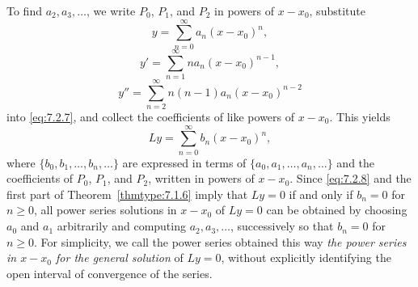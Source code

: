 \documentclass{ximera}
\begin{document}
To find $a_2, a_3, \dots$, we write $P_0$, $P_1$, and $P_2$ in powers of
$x-x_0$, substitute
$$
y=\sum^\infty_{n=0}a_n(x-x_0)^n,
$$
$$
y'=\sum^\infty_{n=1}na_n(x-x_0)^{n-1},
$$
$$
y''=\sum^\infty_{n=2}n(n-1)a_n(x-x_0)^{n-2}
$$
into \eqref{eq:7.2.7}, and collect the coefficients of like powers of
$x-x_0$. This yields
\begin{equation}\label{eq:7.2.8}
Ly=\sum^\infty_{n=0}b_n(x-x_0)^n,
\end{equation}
where $\{b_0, b_1, \dots, b_n, \dots\}$ are expressed in terms of
$\{a_0, a_1, \dots,a_n, \dots\}$ and the coefficients of $P_0$, $P_1$,
and $P_2$, written in powers of $x-x_0$. Since \eqref{eq:7.2.8} and
the first part %
of Theorem~\ref{thmtype:7.1.6} imply that $Ly=0$ if and only if
$b_n=0$ for $n\geq0$,  all power series solutions in
$x-x_0$ of $Ly=0$ can be obtained by choosing $a_0$ and $a_1$
arbitrarily and computing $a_2, a_3, \dots$, successively so that
$b_n=0$
for $n\geq0$. For simplicity, we call the power series obtained  this
way \textit{the power series in $x-x_0$ for the general solution} of
$Ly=0$, without explicitly identifying the open interval of
convergence of the series.
\end{document}

